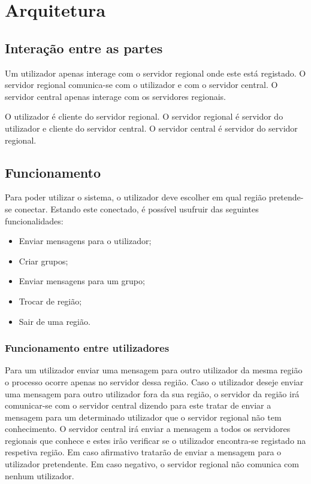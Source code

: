 \chapter{Arquitetura}

\section{Interação entre as partes}
Um utilizador apenas interage com o servidor regional onde este está registado. O servidor regional comunica-se com o utilizador e com o servidor central. O servidor central apenas interage com os servidores regionais.

\begin{figure}[h]
\end{figure}

O utilizador é cliente do servidor regional. O servidor regional é servidor do utilizador e cliente do servidor central. O servidor central é servidor do servidor regional.

\section{Funcionamento}

Para poder utilizar o sistema, o utilizador deve escolher em qual região pretende-se conectar. Estando este conectado, é possível usufruir das seguintes funcionalidades:
\begin{itemize}
	\item Enviar mensagens para o utilizador;
	\item Criar grupos;
	\item Enviar mensagens para um grupo;
	\item Trocar de região;
	\item Sair de uma região.
\end{itemize}

\subsection{Funcionamento entre utilizadores}
Para um utilizador enviar uma mensagem para outro utilizador da mesma região o processo ocorre apenas no servidor dessa região. Caso o utilizador deseje enviar uma mensagem para outro utilizador fora da sua região, o servidor da região irá comunicar-se com o servidor central dizendo para este tratar de enviar a mensagem para um determinado utilizador que o servidor regional não tem conhecimento. O servidor central irá enviar a mensagem a todos os servidores regionais que conhece e estes irão verificar se o utilizador encontra-se registado na respetiva região. Em caso afirmativo tratarão de enviar a mensagem para o utilizador pretendente. Em caso negativo, o servidor regional não comunica com nenhum utilizador.

